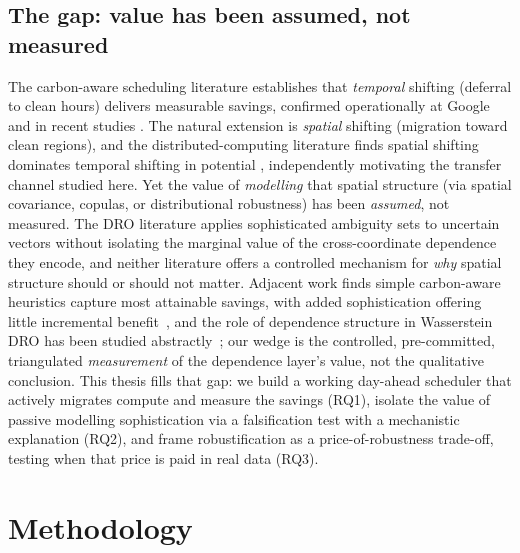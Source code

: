 \documentclass[10pt,twocolumn]{article}
\begin{document}
\subsection{The gap: value has been assumed, not measured}
The carbon-aware scheduling literature establishes that \emph{temporal} shifting
(deferral to clean hours) delivers measurable savings, confirmed operationally at
Google and in recent studies \citep{radovanovic2022,wiesner2021}. The natural extension
is \emph{spatial} shifting (migration toward clean regions), and the
distributed-computing literature finds spatial shifting dominates temporal shifting in
potential \citep{wiesner2021}, independently motivating the transfer channel studied
here. Yet the value of \emph{modelling} that spatial structure (via spatial covariance,
copulas, or distributional robustness) has been \emph{assumed}, not measured. The DRO
literature applies sophisticated ambiguity sets to uncertain vectors without isolating
the marginal value of the cross-coordinate dependence they encode, and neither
literature offers a controlled mechanism for \emph{why} spatial structure should or
should not matter. Adjacent work finds simple carbon-aware heuristics capture most
attainable savings, with added sophistication offering little incremental
benefit~\citep{bostandoost2024}, and the role of dependence structure in Wasserstein
DRO has been studied abstractly~\citep{gao2017}; our wedge is the controlled,
pre-committed, triangulated \emph{measurement} of the dependence layer's value, not
the qualitative conclusion. This thesis fills that gap: we build a working day-ahead
scheduler
that actively migrates compute and measure the savings (RQ1), isolate the value of
passive modelling sophistication via a falsification test with a mechanistic explanation (RQ2),
and frame robustification as a price-of-robustness trade-off, testing when that price is
paid in real data (RQ3).

\section{Methodology}\label{sec:method}
\end{document}
